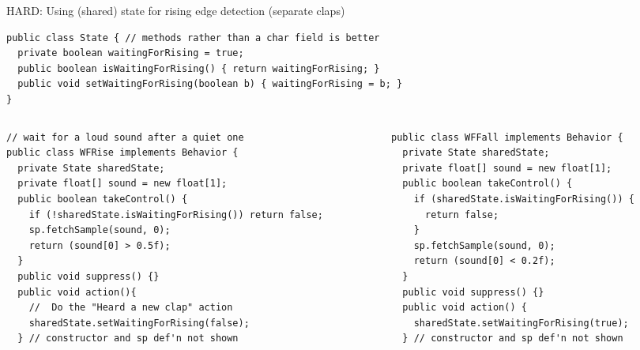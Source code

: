 \documentclass[color=pdftex,usenames,dvipsnames, aspectratio=169]{beamer}
\begin{document}
\begin{frame}[fragile]{HARD: Using (shared) state for rising edge detection (separate claps)}
\vspace*{-3mm}
\begin{lstlisting}[basicstyle=\ttfamily\scriptsize\color{blue}, xleftmargin=0in, linewidth=11cm,emph={State}]
public class State { // methods rather than a char field is better
  private boolean waitingForRising = true;
  public boolean isWaitingForRising() { return waitingForRising; }
  public void setWaitingForRising(boolean b) { waitingForRising = b; }
}
\end{lstlisting}
\vspace*{-3mm}
\begin{columns}[T]
\begin{column}{0.62\textwidth}
\begin{lstlisting}[basicstyle=\ttfamily\scriptsize\color{blue}, framexleftmargin=0.05in, xleftmargin=0in, linewidth=\textwidth,emph={takeControl, suppress, action, State}]
// wait for a loud sound after a quiet one
public class WFRise implements Behavior {
  private State sharedState;
  private float[] sound = new float[1];
  public boolean takeControl() {
    if (!sharedState.isWaitingForRising()) return false;
    sp.fetchSample(sound, 0);
    return (sound[0] > 0.5f);
  }
  public void suppress() {}
  public void action(){
    //  Do the "Heard a new clap" action
    sharedState.setWaitingForRising(false);
  } // constructor and sp def'n not shown
\end{lstlisting}
\end{column}
\begin{column}{0.45\textwidth}
\begin{lstlisting}[basicstyle=\ttfamily\scriptsize\color{blue}, framexleftmargin=0.0in, xleftmargin=-3mm, linewidth=1.04\textwidth,emph={takeControl, suppress, action, State}]
public class WFFall implements Behavior {
  private State sharedState;
  private float[] sound = new float[1];
  public boolean takeControl() {
    if (sharedState.isWaitingForRising()) {
      return false;
    }
    sp.fetchSample(sound, 0);
    return (sound[0] < 0.2f);
  }
  public void suppress() {}
  public void action() {
    sharedState.setWaitingForRising(true);
  } // constructor and sp def'n not shown
\end{lstlisting}
\end{column}
\end{columns}
\end{frame}
\end{document}

